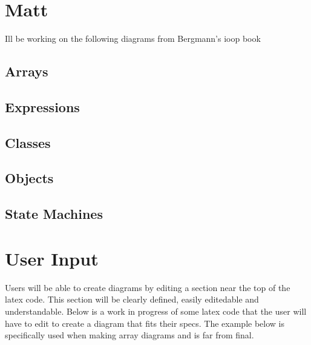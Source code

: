 \documentclass[10pt,a4paper,english]{article}
\begin{document}
\newpage
\begin{flushleft}
\section{Matt}
Ill be working on the following diagrams from Bergmann's ioop book
\subsection{Arrays}

\subsection{Expressions}

\subsection{Classes}

\subsection{Objects}

\subsection{State Machines}

\section{User Input}
Users will be able to create diagrams by editing a section near the top of the latex code.  This section will be clearly defined, easily editedable and understandable.  Below is a work in progress of some latex code that the user will have to edit to create a diagram that fits their specs. The example below is specifically used when making array diagrams and is far from final.


\end{flushleft}
\end{document}
